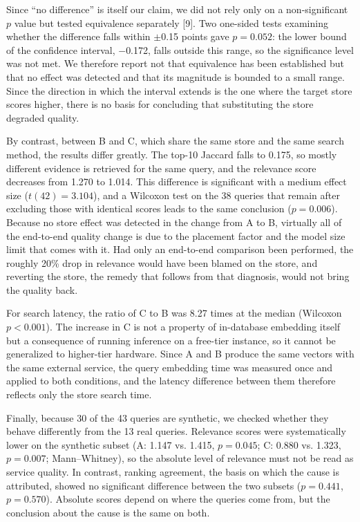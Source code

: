 \documentclass[10pt,a4paper,twocolumn]{article}
\begin{document}
Since ``no difference'' is itself our claim, we did not rely only on a non-significant $p$ value but tested equivalence separately [9]. Two one-sided tests examining whether the difference falls within $\pm$0.15 points gave $p = 0.052$: the lower bound of the confidence interval, $-$0.172, falls outside this range, so the significance level was not met. We therefore report not that equivalence has been established but that no effect was detected and that its magnitude is bounded to a small range. Since the direction in which the interval extends is the one where the target store scores higher, there is no basis for concluding that substituting the store degraded quality.

By contrast, between B and C, which share the same store and the same search method, the results differ greatly. The top-10 Jaccard falls to 0.175, so mostly different evidence is retrieved for the same query, and the relevance score decreases from 1.270 to 1.014. This difference is significant with a medium effect size ($t(42) = 3.104$), and a Wilcoxon test on the 38 queries that remain after excluding those with identical scores leads to the same conclusion ($p = 0.006$). Because no store effect was detected in the change from A to B, virtually all of the end-to-end quality change is due to the placement factor and the model size limit that comes with it. Had only an end-to-end comparison been performed, the roughly 20\% drop in relevance would have been blamed on the store, and reverting the store, the remedy that follows from that diagnosis, would not bring the quality back.

For search latency, the ratio of C to B was 8.27 times at the median (Wilcoxon $p < 0.001$). The increase in C is not a property of in-database embedding itself but a consequence of running inference on a free-tier instance, so it cannot be generalized to higher-tier hardware. Since A and B produce the same vectors with the same external service, the query embedding time was measured once and applied to both conditions, and the latency difference between them therefore reflects only the store search time.

Finally, because 30 of the 43 queries are synthetic, we checked whether they behave differently from the 13 real queries. Relevance scores were systematically lower on the synthetic subset (A: 1.147 vs. 1.415, $p = 0.045$; C: 0.880 vs. 1.323, $p = 0.007$; Mann--Whitney), so the absolute level of relevance must not be read as service quality. In contrast, ranking agreement, the basis on which the cause is attributed, showed no significant difference between the two subsets ($p = 0.441$, $p = 0.570$). Absolute scores depend on where the queries come from, but the conclusion about the cause is the same on both.
\end{document}
